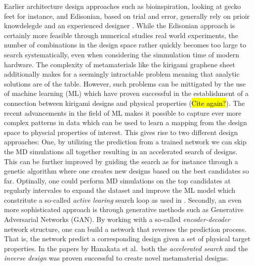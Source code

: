

Earlier architecture design approaches such as bioinspiration, looking at gecko
feet for instance, and Edisonian, based on trial and error, generally rely
on prioir knowdelegde and an experienced designer \cite{Mao}. While the
Edisonian approach is certainly more feasible through numerical studies real world experiments, the number of combinations in the design space rather quickly becomes too large to search systematically, even when considering the simmulation time of modern hardware. The complexity of metamaterials like the kirigami graphene sheet additionally makes for a seemingly intractable problem meaning that analytic solutions are of the table. However, such problems can be mittigated
by the use of machine learning (\acrshort{ML}) which have proven successful in the
establishment of a connection between kirigami designs and physical
properties (\hl{Cite again?}). The recent advancements in the field of
\acrshort{ML} makes it possible to capture ever more complex patterns in data
which can be used to learn a mapping from the design space to physcial properties of interest. This gives rise to two different design approaches: One, by utilizing the prediction from a trained network we can skip
the \acrshort{MD} simulations all together resulting in an accelerated search of
designs. This can be further improved by guiding the search as for instance through a genetic algorithm where one creates new designs based
on the best candidates so far. Optinally, one could perform \acrshort{MD} simulations on the top candidates at regularly intervales to expand the dataset and improve the \acrshort{ML} model which constritute a so-called
\textit{active learing} search loop as used in \cite{PhysRevLett.121.255304}.
Secondly, an even more sophisticated approach is through generative methods such
as Generative Adversarial Networks (GAN). By working with a so-called
\textit{encoder-decoder} network structure, one can build a network that reverses
the prediction process. That is, the network predict a corresponding
design given a set of physical target properties. In the papers by Hanakata et
al.\ both the \textit{accelerated search} and the \textit{inverse design} was
proven successful to create novel metamaterial designs. 


